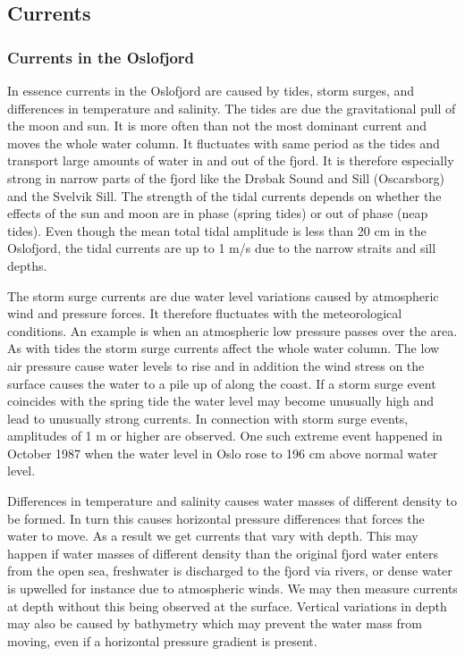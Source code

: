 \subsection{Currents}
\label{subsec:curree}
\subsubsection{Currents in the Oslofjord}
\label{subsubsec:driving}
In essence currents in the Oslofjord are caused by tides, storm surges, and differences in temperature and salinity. The tides are due the gravitational pull of the moon and sun. It is more often than not the most dominant current and moves the whole water column. It fluctuates with same period as the tides and transport large amounts of water in and out of the fjord. It is therefore especially strong in narrow parts of the fjord like the Dr{\o}bak Sound and Sill (Oscarsborg) and the Svelvik Sill. The strength of the tidal currents depends on whether the effects of the sun and moon are in phase (spring tides) or out of phase (neap tides). Even though the mean total tidal amplitude is less than 20 cm in the Oslofjord, the tidal currents are up to 1 m/s due to the narrow straits and sill depths. 

The storm surge currents are due water level variations caused by atmospheric wind and pressure forces. It therefore fluctuates with the meteorological conditions. An example is when an atmospheric low pressure passes over the area. As with tides the storm surge currents affect the whole water column. The low air pressure cause water levels to rise and in addition the wind stress on the surface causes the water to a pile up of along the coast. If a storm surge event coincides with the spring tide the water level may become unusually high and lead to unusually strong currents. In connection with storm surge events, amplitudes of 1 m or higher are observed. One such extreme event happened in October 1987 when the water level in Oslo rose to 196 cm above normal water level. 

Differences in temperature and salinity causes water masses of different density to be formed. In turn this causes horizontal pressure differences that forces the water to move. As a result we get currents that vary with depth. This may happen if water masses of different density than the original fjord water enters from the open sea, freshwater is discharged to the fjord via rivers, or dense water is upwelled for instance due to atmospheric winds. We may then measure currents at depth without this being observed at the surface. Vertical variations in depth may also be caused by bathymetry which may prevent the water mass from moving, even if a horizontal pressure gradient is present.

